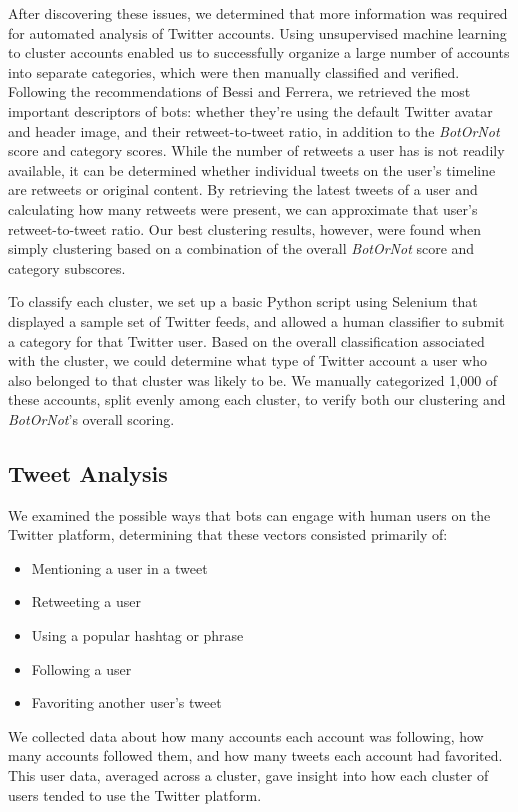 \documentclass{sig-alternate-05-2015}
\begin{document}
After discovering these issues, we determined that more information was required for automated analysis of Twitter accounts. Using unsupervised machine learning to cluster accounts enabled us to successfully organize a large number of accounts into separate categories, which were then manually classified and verified. Following the recommendations of Bessi and Ferrera\cite{Bessi:PresElect}, we retrieved the most important descriptors of bots: whether they're using the default Twitter avatar and header image, and their retweet-to-tweet ratio, in addition to the \emph{BotOrNot} score and category scores. While the number of retweets a user has is not readily available, it can be determined whether individual tweets on the user's timeline are retweets or original content. By retrieving the latest tweets of a user and calculating how many retweets were present, we can approximate that user's retweet-to-tweet ratio. Our best clustering results, however, were found when simply clustering based on a combination of the overall \emph{BotOrNot} score and category subscores.

To classify each cluster, we set up a basic Python script using Selenium that displayed a sample set of Twitter feeds, and allowed a human classifier to submit a category for that Twitter user. Based on the overall classification associated with the cluster, we could determine what type of Twitter account a user who also belonged to that cluster was likely to be. We manually categorized 1,000 of these accounts, split evenly among each cluster, to verify both our clustering and \emph{BotOrNot}'s overall scoring.

\subsection{Tweet Analysis}

We examined the possible ways that bots can engage with human users on the Twitter platform, determining that these vectors consisted primarily of:
\begin{itemize}
	\item Mentioning a user in a tweet
	\item Retweeting a user
	\item Using a popular hashtag or phrase
	\item Following a user
	\item Favoriting another user's tweet
\end{itemize}
We collected data about how many accounts each account was following, how many accounts followed them, and how many tweets each account had favorited. This user data, averaged across a cluster, gave insight into how each cluster of users tended to use the Twitter platform.
\end{document}
